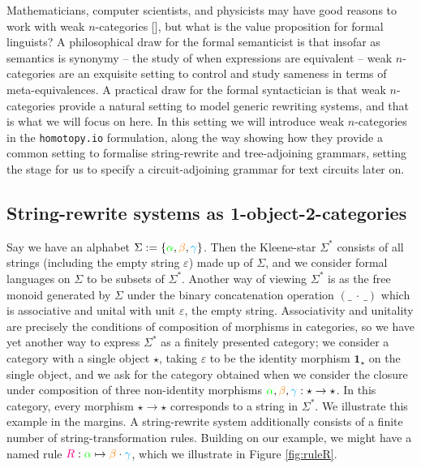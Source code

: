 \begin{fullwidth}
Mathematicians, computer scientists, and physicists may have good reasons to work with weak $n$-categories [], but what is the value proposition for formal linguists? A philosophical draw for the formal semanticist is that insofar as semantics is synonymy -- the study of when expressions are equivalent -- weak $n$-categories are an exquisite setting to control and study sameness in terms of meta-equivalences. A practical draw for the formal syntactician is that weak $n$-categories provide a natural setting to model generic rewriting systems, and that is what we will focus on here. In this setting we will introduce weak $n$-categories in the \texttt{homotopy.io} formulation, along the way showing how they provide a common setting to formalise string-rewrite and tree-adjoining grammars, setting the stage for us to specify a circuit-adjoining grammar for text circuits later on. 
\end{fullwidth}

\subsection{String-rewrite systems as 1-object-2-categories}

Say we have an alphabet $\Sigma := \{\textcolor{green}{\alpha}, \textcolor{orange}{\beta}, \textcolor{cyan}{\gamma}\}$. Then the Kleene-star $\Sigma^*$ consists of all strings (including the empty string $\varepsilon$) made up of $\Sigma$, and we consider formal languages on $\Sigma$ to be subsets of $\Sigma^*$. Another way of viewing $\Sigma^*$ is as the free monoid generated by $\Sigma$ under the binary concatenation operation $(\_ \ \cdot \ \_)$ which is associative and unital with unit $\varepsilon$, the empty string. Associativity and unitality are precisely the conditions of composition of morphisms in categories, so we have yet another way to express $\Sigma^*$ as a finitely presented category; we consider a category with a single object $\star$, taking $\varepsilon$ to be the identity morphism $\textbf{1}_\star$ on the single object, and we ask for the category obtained when we consider the closure under composition of three non-identity morphisms $\textcolor{green}{\alpha}, \textcolor{orange}{\beta}, \textcolor{cyan}{\gamma}: \star \rightarrow \star$. In this category, every morphism $\star \rightarrow \star$ corresponds to a string in $\Sigma^*$. We illustrate this example in the margins. A string-rewrite system additionally consists of a finite number of string-transformation rules. Building on our example, we might have a named rule $\textcolor{magenta}{R}: \textcolor{green}{\alpha} \mapsto \textcolor{orange}{\beta} \cdot \textcolor{cyan}{\gamma}$, which we illustrate in Figure \ref{fig:ruleR}.\\

